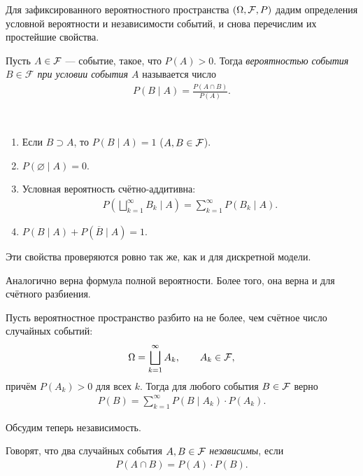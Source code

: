 \documentclass[../main.tex]{subfiles}
\begin{document}
Для зафиксированного вероятностного пространства $ (\Omega,\mathcal F,P) $ дадим определения условной вероятности и независимости событий, и снова перечислим их простейшие свойства.

\begin{df}
 Пусть $A \in \mathcal F$ --- событие, такое, что $P(A) > 0$. Тогда \textit{вероятностью события $B \in \mathcal F$ при условии события $A$} называется число
 \begin{align*}
  P(B \mid A) = \frac{P(A\cap B)}{P(A)}.
 \end{align*}
\end{df}

\begin{prop}\
 \begin{enumerate}
  \item Если $ B \supset A $, то $ P(B\mid A) = 1 $ ($ A,B\in\mathcal F $).
  \item $ P(\varnothing \mid A) = 0 $.
  \item Условная вероятность счётно-аддитивна:
   \begin{align*}
    P \left( \bigsqcup_{k=1}^{\infty} B_k \mid A \right) = \sum_{k=1}^{\infty}P(B_k \mid A).
   \end{align*}
  \item $ P(B \mid A) + P(\overline B \mid A) = 1 $.
 \end{enumerate}
\end{prop}

Эти свойства проверяются ровно так же, как и для дискретной модели.

Аналогично верна формула полной вероятности. Более того, она верна и для счётного разбиения.

\begin{prop}
 Пусть вероятностное пространство разбито на не более, чем счётное число случайных событий:
 \begin{align*}
  \Omega = \bigsqcup_{k=1}^{\infty} A_k, \qquad A_k \in \mathcal F,
 \end{align*} причём $ P(A_k) > 0 $ для всех  $ k $. Тогда для любого события $ B \in \mathcal F $  верно
 \begin{align*}
  P(B) = \sum_{k=1}^{\infty} P(B \mid A_k) \cdot P(A_k).
 \end{align*}
\end{prop}
Обсудим теперь независимость.
\begin{df}
 Говорят, что два случайных события $A, B \in \mathcal F$ \textit{независимы}, если
 \begin{align*}
  P(A \cap B) = P(A) \cdot P(B).
 \end{align*}
\end{df}
\end{document}
